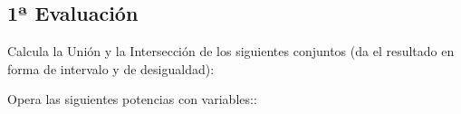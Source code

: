 \documentclass[spanish, 11pt]{exam}
\begin{document}
\begin{questions}

\section*{1ª Evaluación}   

    \question Calcula la Unión y la Intersección de los siguientes conjuntos (da el resultado en forma de intervalo y de desigualdad):
        \begin{multicols}{1} 
        \begin{parts} \part[1] $A=\left[2, 10\right)$ y $B=\left(7, 12\right)$  \begin{solution}   Unión: \\ $A\cup B=\left[2, 12\right)$ ó $A\cup B= \{x|2 \leq x  < 12\}$ \\Intersección: \\ $A\cap B =\left(7, 10\right)$ ó $A\cap B=\{x|7 < x < 10\}$ \end{solution} 
        \end{parts}
        \end{multicols}
        
        \question Opera las siguientes potencias con variables::
        \begin{multicols}{1} 
\end{multicols}
\end{questions}
\end{document}

